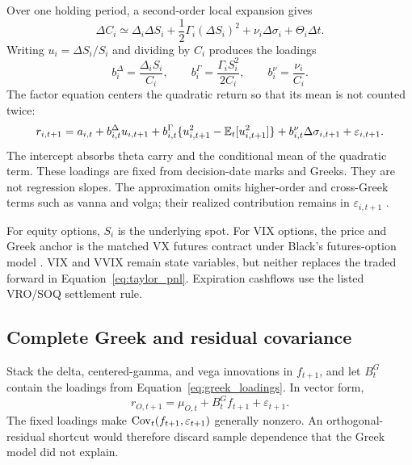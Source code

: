 Over one holding period, a second-order local expansion gives
\begin{equation}
  \Delta C_i
  \simeq \Delta_i\Delta S_i
  +\frac{1}{2}\Gamma_i(\Delta S_i)^2
  +\nu_i\Delta\sigma_i+\Theta_i\Delta t.
  \label{eq:taylor_pnl}
\end{equation}
Writing \(u_i=\Delta S_i/S_i\) and dividing by \(C_i\) produces the loadings
\begin{equation}
  b_i^\Delta=\frac{\Delta_iS_i}{C_i},\qquad
  b_i^\Gamma=\frac{\Gamma_iS_i^2}{2C_i},\qquad
  b_i^\nu=\frac{\nu_i}{C_i}.
  \label{eq:greek_loadings}
\end{equation}
The factor equation centers the quadratic return so that its mean is not counted twice:
\begin{equation}
  r_{i,t+1}=a_{i,t}
  +b_{i,t}^\Delta u_{i,t+1}
  +b_{i,t}^\Gamma\{u_{i,t+1}^2-\mathbb{E}_t[u_{i,t+1}^2]\}
  +b_{i,t}^\nu\Delta\sigma_{i,t+1}
  +\varepsilon_{i,t+1}.
  \label{eq:option_factor_return}
\end{equation}
The intercept absorbs theta carry and the conditional mean of the quadratic term. These
loadings are fixed from decision-date marks and Greeks. They are not regression slopes.
The approximation omits higher-order and cross-Greek terms such as vanna and volga; their
realized contribution remains in \(\varepsilon_{i,t+1}\)
\citep{blackscholes1973,merton1973,shreve2004stochasticii}.

For equity options, \(S_i\) is the underlying spot. For VIX options, the price and Greek
anchor is the matched VX futures contract under Black's futures-option model
\citep{black1976commodity}. VIX and VVIX remain state variables, but neither replaces the
traded forward in Equation~\eqref{eq:taylor_pnl}. Expiration cashflows use the listed
VRO/SOQ settlement rule.

\subsection{Complete Greek and residual covariance}

Stack the delta, centered-gamma, and vega innovations in \(f_{t+1}\), and let \(B^G_t\)
contain the loadings from Equation~\eqref{eq:greek_loadings}. In vector form,
\begin{equation}
  r_{O,t+1}=\mu_{O,t}+B^G_tf_{t+1}+\varepsilon_{t+1}.
  \label{eq:vector_return}
\end{equation}
The fixed loadings make \(\operatorname{Cov}_t(f_{t+1},\varepsilon_{t+1})\) generally nonzero. An
orthogonal-residual shortcut would therefore discard sample dependence that the Greek
model did not explain.

